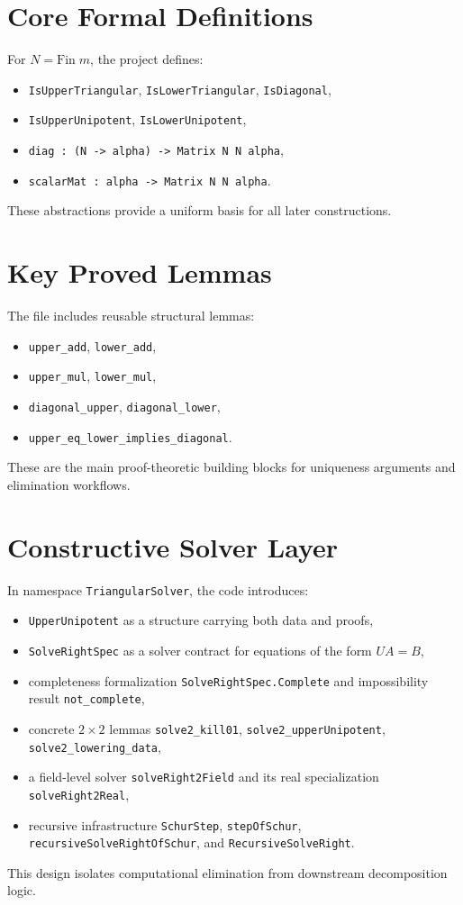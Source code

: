 \documentclass[11pt]{article}
\begin{document}
\section{Core Formal Definitions}
For $N = \mathrm{Fin}\;m$, the project defines:
\begin{itemize}[leftmargin=1.5em]
\item \texttt{IsUpperTriangular}, \texttt{IsLowerTriangular}, \texttt{IsDiagonal},
\item \texttt{IsUpperUnipotent}, \texttt{IsLowerUnipotent},
\item \texttt{diag : (N -> alpha) -> Matrix N N alpha},
\item \texttt{scalarMat : alpha -> Matrix N N alpha}.
\end{itemize}
These abstractions provide a uniform basis for all later constructions.

\section{Key Proved Lemmas}
The file includes reusable structural lemmas:
\begin{itemize}[leftmargin=1.5em]
\item \texttt{upper\_add}, \texttt{lower\_add},
\item \texttt{upper\_mul}, \texttt{lower\_mul},
\item \texttt{diagonal\_upper}, \texttt{diagonal\_lower},
\item \texttt{upper\_eq\_lower\_implies\_diagonal}.
\end{itemize}
These are the main proof-theoretic building blocks for uniqueness arguments and elimination workflows.

\section{Constructive Solver Layer}
In namespace \texttt{TriangularSolver}, the code introduces:
\begin{itemize}[leftmargin=1.5em]
\item \texttt{UpperUnipotent} as a structure carrying both data and proofs,
\item \texttt{SolveRightSpec} as a solver contract for equations of the form $U A = B$,
\item completeness formalization \texttt{SolveRightSpec.Complete} and impossibility result \texttt{not\_complete},
\item concrete $2\times 2$ lemmas \texttt{solve2\_kill01}, \texttt{solve2\_upperUnipotent}, \texttt{solve2\_lowering\_data},
\item a field-level solver \texttt{solveRight2Field} and its real specialization \texttt{solveRight2Real},
\item recursive infrastructure \texttt{SchurStep}, \texttt{stepOfSchur}, \texttt{recursiveSolveRightOfSchur}, and \texttt{RecursiveSolveRight}.
\end{itemize}
This design isolates computational elimination from downstream decomposition logic.
\end{document}
